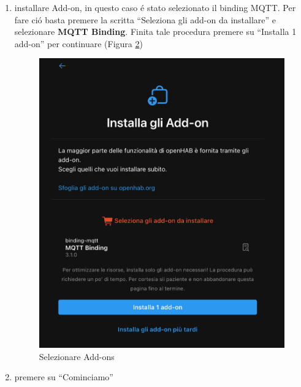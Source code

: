\begin{enumerate}
\begin{figure}
        \label{fig:location}
    \end{figure}
    \item installare Add-on, in questo caso \'e stato selezionato il binding MQTT. Per fare ci\'o basta premere la scritta ``Seleziona gli add-on da installare'' e selezionare \textbf{MQTT Binding}. Finita tale procedura premere su ``Installa 1 add-on'' per continuare (Figura \ref{fig:add_on})
    \begin{figure}
        \centering
        \includegraphics[width=12cm]{Immagini/add_on}
        \caption{Selezionare Add-ons}
        \label{fig:add_on}
    \end{figure}
    \item premere su ``Cominciamo''
\end{enumerate}

